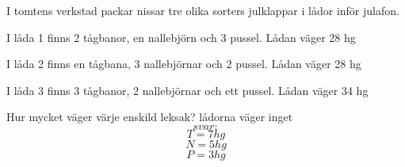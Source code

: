 \documentclass{article}
\begin{document}
I tomtens verkstad packar nissar tre olika sorters julklappar i lådor inför julafon.

I låda 1 finns 2 tågbanor, en nallebjörn och 3 pussel. Lådan väger 28 hg

I låda 2 finns en tågbana, 3 nallebjörnar och 2 pussel. Lådan väger 28 hg

I låda 3 finns 3 tågbanor, 2 nallebjörnar och ett pussel. Lådan väger 34 hg

Hur mycket väger värje enskild leksak? lådorna väger inget
$$svar:$$
$$T = 7hg$$
$$N = 5hg$$
$$P = 3hg$$
\end{document}
